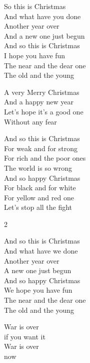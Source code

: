 
\ve{}
So this is Christmas\\
And what have you done\\
Another year over\\
And a new one just begun\\
And so this is Christmas\\
I hope you have fun\\
The near and the dear one\\
The old and the young

\cho{}
A very Merry Christmas\\
And a happy new year\\
Let's hope it's a good one \\
Without any fear 

\ve{}
And so this is Christmas\\
For weak and for strong\\
For rich and the poor ones\\
The world is so wrong\\
And so happy Christmas\\
For black and for white\\
For yellow and red one\\
Let's stop all the fight

\begin{multicols}{2}

\cho{}


\ve{}
And so this is Christmas\\
And what have we done\\
Another year over\\
A new one just begun\\
And so happy Christmas\\
We hope you have fun\\
The near and the dear one\\
The old and the young

\cho{}

\re{*:}
War is over\\
if you want it\\
War is over\\
now

\end{multicols}

\esong{}

